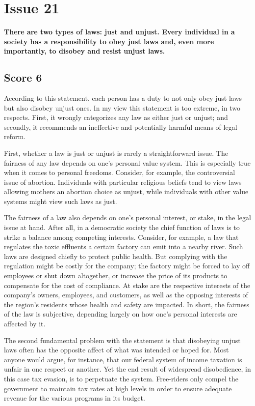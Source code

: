 \section{Issue 21}
\paragraph{
There are two types of laws: just and unjust.
Every individual in a society has a responsibility to obey just laws and, even more importantly, to disobey and resist unjust laws.
}
\subsection{Score 6}


According to this statement, each person has a duty to not only obey just laws but also disobey unjust ones.
In my view this statement is too extreme, in two respects.
First, it wrongly categorizes any law as either just or unjust; and secondly, it recommends an ineffective and potentially harmful means of legal reform.


First, whether a law is just or unjust is rarely a straightforward issue.
The fairness of any law depends on one's personal value system.
This is especially true when it comes to personal freedoms.
Consider, for example, the controversial issue of abortion.
Individuals with particular religious beliefs tend to view laws allowing mothers an abortion choice as unjust, while individuals with other value systems might view such laws as just.


The fairness of a law also depends on one's personal interest, or stake, in the legal issue at hand.
After all, in a democratic society the chief function of laws is to strike a balance among competing interests.
Consider, for example, a law that regulates the toxic effluents a certain factory can emit into a nearby river.
Such laws are designed chiefly to protect public health.
But complying with the regulation might be costly for the company; the factory might be forced to lay off employees or shut down altogether, or increase the price of its products to compensate for the cost of compliance.
At stake are the respective interests of the company's owners, employees, and customers, as well as the opposing interests of the region's residents whose health and safety are impacted.
In short, the fairness of the law is subjective, depending largely on how one's personal interests are affected by it.


The second fundamental problem with the statement is that disobeying unjust laws often has the opposite affect of what was intended or hoped for.
Most anyone would argue, for instance, that our federal system of income taxation is unfair in one respect or another.
Yet the end result of widespread disobedience, in this case tax evasion, is to perpetuate the system.
Free-riders only compel the government to maintain tax rates at high levels in order to ensure adequate revenue for the various programs in its budget.


